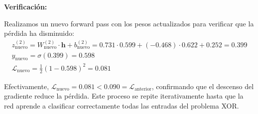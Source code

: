 \textbf{Verificación:}

Realizamos un nuevo forward pass con los pesos actualizados para verificar que la pérdida ha disminuido:
\begin{gather*}
	z^{(2)}_{\text{nuevo}} = W^{(2)}_{\text{nuevo}} \cdot \mathbf{h} + b^{(2)}_{\text{nuevo}} = 0.731 \cdot 0.599 + (-0.468) \cdot 0.622 + 0.252 = 0.399 \\
	\hat{y}_{\text{nuevo}} = \sigma(0.399) = 0.598 \\
	\mathcal{L}_{\text{nuevo}} = \frac{1}{2}(1 - 0.598)^2 = 0.081
\end{gather*}

Efectivamente, \(\mathcal{L}_{\text{nuevo}} = 0.081 < 0.090 = \mathcal{L}_{\text{anterior}}\), confirmando que el descenso del gradiente reduce la pérdida. Este proceso se repite iterativamente hasta que la red aprende a clasificar correctamente todas las entradas del problema XOR.

